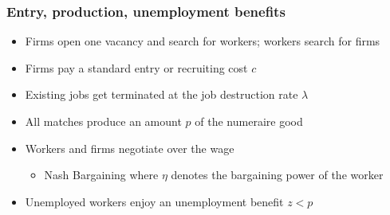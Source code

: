 \documentclass[9pt,xcolor={svgnames}]{beamer}
\begin{document}



\begin{frame}

\frametitle{Entry, production, unemployment benefits}

\begin{itemize}

\setlength\itemsep{1.8em}


\item Firms open one vacancy and search for workers; workers search for firms  

\item Firms pay a standard entry or recruiting cost $c$

\item Existing jobs get terminated at the job destruction rate $\lambda$

\item All matches produce an amount $p$ of the numeraire good

\item Workers and firms negotiate over the wage
\begin{itemize}
\smallskip
\item Nash Bargaining where $\eta$ denotes the bargaining power of the worker  
\end{itemize}

\item Unemployed workers enjoy an unemployment benefit $z<p$


\end{itemize}


\end{frame}





\end{document}
